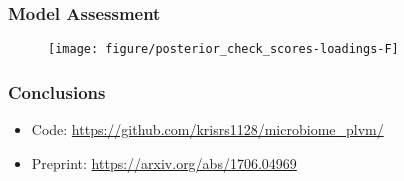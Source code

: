 \documentclass{beamer}
\begin{document}
\begin{frame}
  \frametitle{Model Assessment}
  \begin{figure}[!p]
    \centering
    \texttt{[image: figure/posterior\_check\_scores-loadings-F]}
  \end{figure} 
\end{frame}


\begin{frame}
  \frametitle{Conclusions}
 \begin{itemize}
 \item Code: \url{https://github.com/krisrs1128/microbiome_plvm/}
 \item Preprint: \url{https://arxiv.org/abs/1706.04969}
 \end{itemize} 
\end{frame}
\end{document}
